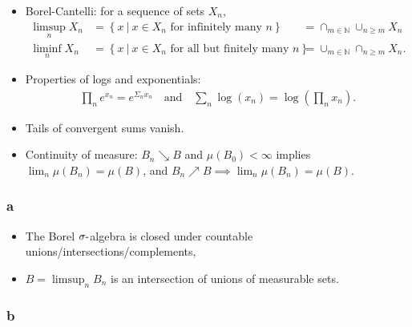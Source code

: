 \begin{solution}

\hfill

\begin{concept}

\hfill

\begin{itemize}
\item
  Borel-Cantelli: for a sequence of sets \(X_n\),
  \begin{align*}
  \limsup_n X_n &= \left\{{x {~\mathrel{\Big|}~}x\in X_n \text{ for infinitely many $n$} }\right\} 
  &= \cap_{m\in {\mathbb{N}}} \cup_{n\geq m} X_n
  \\
  \liminf_n X_n &= \left\{{x {~\mathrel{\Big|}~}x\in X_n \text{ for all but finitely many $n$} }\right\}
  &= \cup_{m\in {\mathbb{N}}} \cap_{n\geq m} X_n
  .\end{align*}
\item
  Properties of logs and exponentials:
  \begin{align*}
  \prod_n e^{x_n} = e^{\Sigma_n x_n} \quad\text{and} \quad \sum_n \log(x_n) = \log\left(\prod_n x_n\right)
  .\end{align*}
\item
  Tails of convergent sums vanish.
\item
  Continuity of measure: \(B_n \searrow B\) and \(\mu(B_0)<\infty\)
  implies \(\lim_n \mu(B_n) = \mu(B)\), and
  \(B_n\nearrow B \implies \lim_n \mu(B_n) = \mu(B)\).
\end{itemize}

\end{concept}

\hypertarget{a-1}{%
\subsubsection{a}\label{a-1}}

\begin{itemize}
\tightlist
\item
  The Borel \(\sigma{\hbox{-}}\)algebra is closed under countable
  unions/intersections/complements,
\item
  \(B = \limsup_n B_n\) is an intersection of unions of measurable sets.
\end{itemize}

\hypertarget{b-1}{%
\subsubsection{b}\label{b-1}}


\end{solution}
